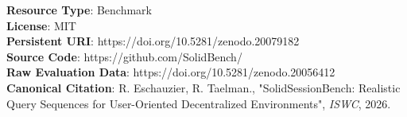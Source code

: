 \documentclass[runningheads]{llncs}
\begin{document}
\noindent \textbf{Resource Type}: Benchmark \\
\textbf{License}: MIT \\
\textbf{Persistent URI}: https://doi.org/10.5281/zenodo.20079182 \\
\textbf{Source Code}: https://github.com/SolidBench/ \\
\textbf{Raw Evaluation Data}: https://doi.org/10.5281/zenodo.20056412 \\
\textbf{Canonical Citation}: R. Eschauzier, R. Taelman., "SolidSessionBench: Realistic Query Sequences for User-Oriented Decentralized Environments", \emph{ISWC}, 2026.









% 
% 

%
%
% 
% 
%


\end{document}

